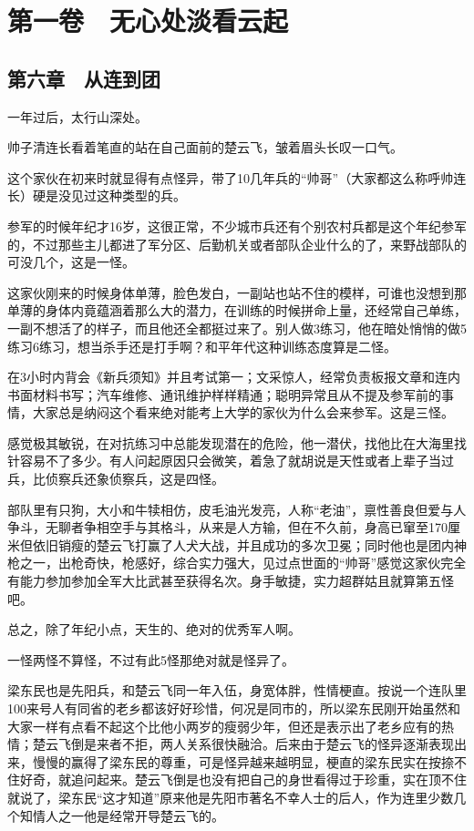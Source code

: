 \chapter{第一卷　无心处淡看云起}

\section{第六章　从连到团}

一年过后，太行山深处。

帅子清连长看着笔直的站在自己面前的楚云飞，皱着眉头长叹一口气。

这个家伙在初来时就显得有点怪异，带了10几年兵的“帅哥”（大家都这么称呼帅连长）硬是没见过这种类型的兵。

参军的时候年纪才16岁，这很正常，不少城市兵还有个别农村兵都是这个年纪参军的，不过那些主儿都进了军分区、后勤机关或者部队企业什么的了，来野战部队的可没几个，这是一怪。

这家伙刚来的时候身体单薄，脸色发白，一副站也站不住的模样，可谁也没想到那单薄的身体内竟蕴涵着那么大的潜力，在训练的时候拼命上量，还经常自己单练，一副不想活了的样子，而且他还全都挺过来了。别人做3练习，他在暗处悄悄的做5练习6练习，想当杀手还是打手啊？和平年代这种训练态度算是二怪。

在3小时内背会《新兵须知》并且考试第一；文采惊人，经常负责板报文章和连内书面材料书写；汽车维修、通讯维护样样精通；聪明异常且从不提及参军前的事情，大家总是纳闷这个看来绝对能考上大学的家伙为什么会来参军。这是三怪。

感觉极其敏锐，在对抗练习中总能发现潜在的危险，他一潜伏，找他比在大海里找针容易不了多少。有人问起原因只会微笑，着急了就胡说是天性或者上辈子当过兵，比侦察兵还象侦察兵，这是四怪。

部队里有只狗，大小和牛犊相仿，皮毛油光发亮，人称“老油”，禀性善良但爱与人争斗，无聊者争相空手与其格斗，从来是人方输，但在不久前，身高已窜至170厘米但依旧销瘦的楚云飞打赢了人犬大战，并且成功的多次卫冕；同时他也是团内神枪之一，出枪奇快，枪感好，综合实力强大，见过点世面的“帅哥”感觉这家伙完全有能力参加参加全军大比武甚至获得名次。身手敏捷，实力超群姑且就算第五怪吧。

总之，除了年纪小点，天生的、绝对的优秀军人啊。

一怪两怪不算怪，不过有此5怪那绝对就是怪异了。

梁东民也是先阳兵，和楚云飞同一年入伍，身宽体胖，性情梗直。按说一个连队里100来号人有同省的老乡都该好好珍惜，何况是同市的，所以梁东民刚开始虽然和大家一样有点看不起这个比他小两岁的瘦弱少年，但还是表示出了老乡应有的热情；楚云飞倒是来者不拒，两人关系很快融洽。后来由于楚云飞的怪异逐渐表现出来，慢慢的赢得了梁东民的尊重，可是怪异越来越明显，梗直的梁东民实在按捺不住好奇，就追问起来。楚云飞倒是也没有把自己的身世看得过于珍重，实在顶不住就说了，梁东民“这才知道”原来他是先阳市著名不幸人士的后人，作为连里少数几个知情人之一他是经常开导楚云飞的。

